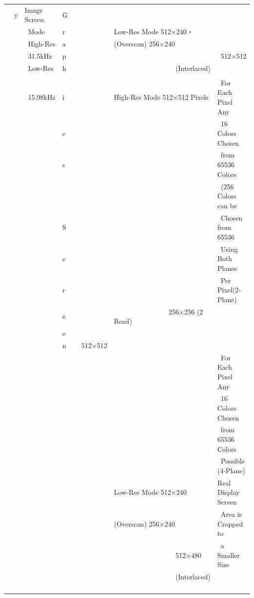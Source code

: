 ﻿\documentclass[twoside,a4paper,12pt]{article}
\begin{document}
\begin{tabular}{|p{13mm}|p{23mm}|p{4mm}|p{20mm}|p{65mm}|p{36mm}|}
\ \ y & Image Screen & G & & &\\[2mm]
& \ Mode & r & & Low-Res Mode 512×240・ &\\[2mm]
& \ High-Res & a & & (Overscan) 256×240 &\\[2mm]
& \ 31.5kHz & p & & & \ 512×512\\[2mm]
& \ Low-Res & h & & \ \ \ \ \ \ \ \ \ \ \ \ \ \ \ \ \ \ (Interlaced) &\\
\cline{5-6}
& & & & &\\[-4mm]
& \ 15.98kHz & i & & High-Res Mode 512×512 Pixels & \ For Each Pixel Any\\
& & c & & & \ 16 Colors Chosen\\
& & s & & & \ from 65536 Colors\\
& & & & & \ (256 Colors can be\\
& & S & & & \ Chosen from 65536\\
& & c & & & \ Using Both Planes\\
& & r & & & \ Per Pixel(2-Plane)\\
& & e & & \ \ \ \ \ \ \ \ \ \ \ \ \ \ \ \ 256×256 (2 Read) &\\
& & e & & &\\
& & n & \ \ 512×512 & &\\
& & & & & \ For Each Pixel Any\\
& & & & & \ 16 Colors Chosen\\
& & & & & \ from 65536 Colors\\
& & & & & \ Possible (4-Plane)\\
& & & & Low-Res Mode 512×240	& Real Display Screen\\
& & & & (Overscan) 256×240 & \ Area is Cropped to\\
& & & & \ \ \ \ \ \ \ \ \ \ \ \ \ \ \ \ \ \ 512×480 & \ a Smaller Size\\
& & & & \ \ \ \ \ \ \ \ \ \ \ \ \ \ \ \ \ \ (Interlaced) &\\
& & & & &\\
& & & & &\\
& & & & &\\
& & & & &\\
\hline
\end{tabular}

\newpage
\end{document}
